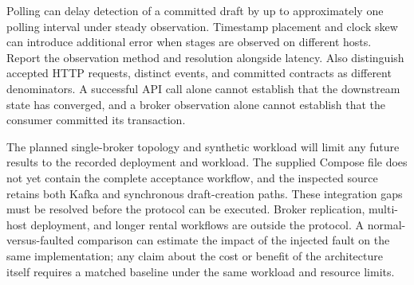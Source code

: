 Polling can delay detection of a committed draft by up to approximately one polling interval under steady observation. Timestamp placement and clock skew can introduce additional error when stages are observed on different hosts. Report the observation method and resolution alongside latency. Also distinguish accepted HTTP requests, distinct events, and committed contracts as different denominators. A successful API call alone cannot establish that the downstream state has converged, and a broker observation alone cannot establish that the consumer committed its transaction.

The planned single-broker topology and synthetic workload will limit any future results to the recorded deployment and workload. The supplied Compose file does not yet contain the complete acceptance workflow, and the inspected source retains both Kafka and synchronous draft-creation paths. These integration gaps must be resolved before the protocol can be executed. Broker replication, multi-host deployment, and longer rental workflows are outside the protocol. A normal-versus-faulted comparison can estimate the impact of the injected fault on the same implementation; any claim about the cost or benefit of the architecture itself requires a matched baseline under the same workload and resource limits.
